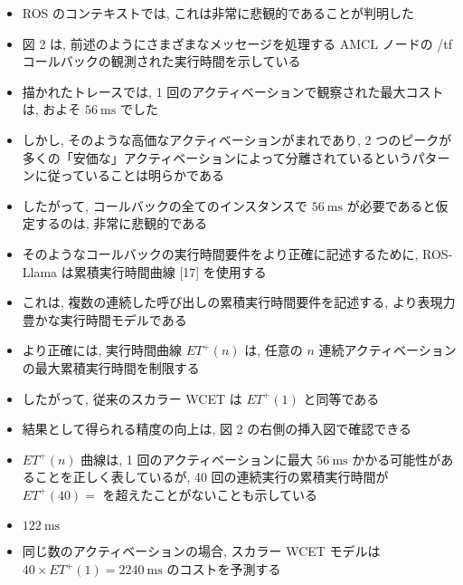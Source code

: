 \begin{frame}{}
    \begin{itemize}
        \item ROS のコンテキストでは, これは非常に悲観的であることが判明した
\item 図 2 は, 前述のようにさまざまなメッセージを処理する AMCL ノードの /tf コールバックの観測された実行時間を示している
\item 描かれたトレースでは, 1 回のアクティベーションで観察された最大コストは, およそ $56 \mathrm{~ms}$ でした
\item しかし, そのような高価なアクティベーションがまれであり, 2 つのピークが多くの「安価な」アクティベーションによって分離されているというパターンに従っていることは明らかである
\item したがって, コールバックの全てのインスタンスで $56 \mathrm{~ms}$ が必要であると仮定するのは, 非常に悲観的である
    \end{itemize}
\end{frame}

\begin{frame}{}
    \begin{itemize}
        \item そのようなコールバックの実行時間要件をより正確に記述するために, ROS-Llama は累積実行時間曲線 [17] を使用する
\item これは, 複数の連続した呼び出しの累積実行時間要件を記述する, より表現力豊かな実行時間モデルである
\item より正確には, 実行時間曲線 $E T^{+}(n)$ は, 任意の $n$ 連続アクティベーションの最大累積実行時間を制限する
\item したがって, 従来のスカラー WCET は $E T^{+}(1)$ と同等である
    \end{itemize}
\end{frame}

\begin{frame}{}
    \begin{itemize}
        \item 結果として得られる精度の向上は, 図 2 の右側の挿入図で確認できる
\item $E T^{+}(n)$ 曲線は, 1 回のアクティベーションに最大 $56 \mathrm{~ms}$ かかる可能性があることを正しく表しているが, 40 回の連続実行の累積実行時間が $E T^{+}(40)=$ を超えたことがないことも示している
\item $122 \mathrm{~ms}$
\item 同じ数のアクティベーションの場合, スカラー WCET モデルは $40 \times E T^{+}(1)=2240 \mathrm{~ms}$ のコストを予測する
    \end{itemize}
\end{frame}

